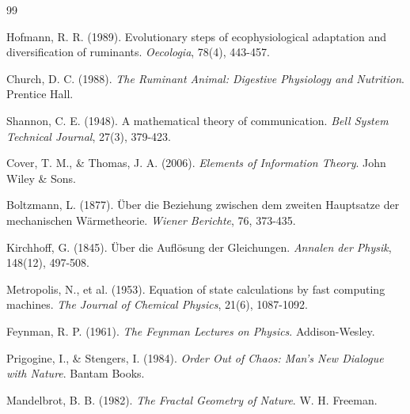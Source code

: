 \documentclass[12pt]{article}
\begin{document}

\begin{thebibliography}{99}

Hofmann, R. R. (1989). Evolutionary steps of ecophysiological adaptation and diversification of ruminants. \textit{Oecologia}, 78(4), 443-457.

Church, D. C. (1988). \textit{The Ruminant Animal: Digestive Physiology and Nutrition}. Prentice Hall.

Shannon, C. E. (1948). A mathematical theory of communication. \textit{Bell System Technical Journal}, 27(3), 379-423.

Cover, T. M., \& Thomas, J. A. (2006). \textit{Elements of Information Theory}. John Wiley \& Sons.

Boltzmann, L. (1877). Über die Beziehung zwischen dem zweiten Hauptsatze der mechanischen Wärmetheorie. \textit{Wiener Berichte}, 76, 373-435.

Kirchhoff, G. (1845). Über die Auflösung der Gleichungen. \textit{Annalen der Physik}, 148(12), 497-508.

Metropolis, N., et al. (1953). Equation of state calculations by fast computing machines. \textit{The Journal of Chemical Physics}, 21(6), 1087-1092.

Feynman, R. P. (1961). \textit{The Feynman Lectures on Physics}. Addison-Wesley.

Prigogine, I., \& Stengers, I. (1984). \textit{Order Out of Chaos: Man's New Dialogue with Nature}. Bantam Books.

Mandelbrot, B. B. (1982). \textit{The Fractal Geometry of Nature}. W. H. Freeman.

\end{thebibliography}
\end{document}
